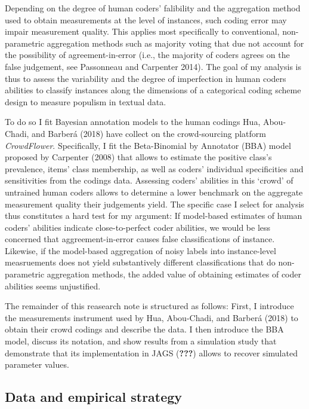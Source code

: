 \documentclass[]{article}
\begin{document}
Depending on the degree of human coders' falibility and the aggregation
method used to obtain measurements at the level of instances, such
coding error may impair measurement quality. This applies most
specifically to conventional, non-parametric aggregation methods such as
majority voting that due not account for the possibility of
agreement-in-error (i.e., the majority of coders agrees on the false
judgement, see Passonneau and Carpenter 2014). The goal of my analysis
is thus to assess the variability and the degree of imperfection in
human coders abilities to classify instances along the dimensions of a
categorical coding scheme design to measure populism in textual data.

To do so I fit Bayesian annotation models to the human codings Hua,
Abou-Chadi, and Barberá (2018) have collect on the crowd-sourcing
platform \emph{CrowdFlower}. Specifically, I fit the Beta-Binomial by
Annotator (BBA) model proposed by Carpenter (2008) that allows to
estimate the positive class's prevalence, items' class membership, as
well as coders' individual specificities and sensitivities from the
codings data. Assessing coders' abilities in this `crowd' of untrained
human coders allows to determine a lower benchmark on the aggregate
measurement quality their judgements yield. The specific case I select
for analysis thus constitutes a hard test for my argument: If
model-based estimates of human coders' abilities indicate
close-to-perfect coder abilities, we would be less concerned that
aggreement-in-error causes false classifications of instance. Likewise,
if the model-based aggregation of noisy labels into instance-level
measruements does not yield substantively different classifications that
do non-parametric aggregation methods, the added value of obtaining
estimates of coder abilities seems unjustified.

The remainder of this reasearch note is structured as follows: First, I
introduce the measurements instrument used by Hua, Abou-Chadi, and
Barberá (2018) to obtain their crowd codings and describe the data. I
then introduce the BBA model, discuss its notation, and show results
from a simulation study that demonstrate that its implementation in JAGS
({\textbf{???}}) allows to recover simulated parameter values.

\hypertarget{data-and-empirical-strategy}{%
\subsection{Data and empirical
strategy}\label{data-and-empirical-strategy}}
\end{document}
